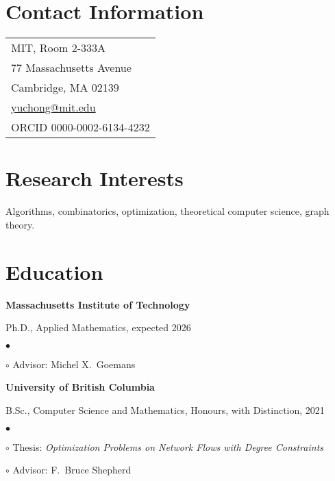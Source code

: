 \documentclass[margin,line]{res}
\newenvironment{list1}{
  \begin{list}{\ding{113}}{%
      \setlength{\itemsep}{0in}
      \setlength{\parsep}{0.025in} \setlength{\parskip}{0in}
      \setlength{\topsep}{0in} \setlength{\partopsep}{0in}
      \setlength{\leftmargin}{0.17in}}}{\end{list}}
\newenvironment{list2}{
  \begin{list}{$\bullet$}{%
      \setlength{\itemsep}{0in}
      \setlength{\parsep}{0in} \setlength{\parskip}{0in}
      \setlength{\topsep}{0in} \setlength{\partopsep}{0in}
      \setlength{\leftmargin}{0.2in}}}{\end{list}}
\begin{document}

\begin{resume}

\section{\sc Contact Information}

\vspace{.05in}
\begin{tabular}{p{2in}}
MIT, Room 2-333A \\
77 Massachusetts Avenue \\
Cambridge, MA 02139 \\
\href{mailto:yuchong@mit.edu}{yuchong@mit.edu} \\
ORCID 0000-0002-6134-4232
\end{tabular}


\section{\sc Research Interests}
Algorithms, combinatorics, optimization, theoretical computer science, graph theory.

\section{\sc Education}

{\bf Massachusetts Institute of Technology} \\
\vspace*{-.1in}
\begin{list1}
\item[] Ph.D., Applied Mathematics, expected 2026
  \begin{list2}
    \item[$\circ$] Advisor: Michel X.\ Goemans
  \end{list2}
\end{list1}

{\bf University of British Columbia}\\
\vspace*{-.1in}
\begin{list1}
\item[] B.Sc., Computer Science and Mathematics, Honours, with Distinction, 2021
  \begin{list2}
  \item[$\circ$] Thesis: \emph{Optimization Problems on Network Flows with Degree Constraints} %
  \item[$\circ$] Advisor: F.\ Bruce Shepherd
  \end{list2}
\end{list1}



\end{resume}
\end{document}
